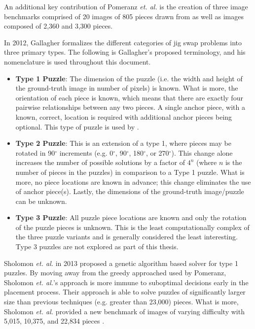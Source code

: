 \documentclass{report}
\newcommand{\numbwithdegreesymbol}[1]{#1$^\circ$}
\begin{document}
An additional key contribution of Pomeranz \textit{et. al.} is the creation of three image benchmarks comprised of 20 images of 805 pieces drawn from \cite{mcgillImageDatabase} as well as images composed of 2,360 and 3,300 pieces.

In 2012, Gallagher \cite{gallagher2012} formalizes the different categories of jig swap problems into three primary types.  The following is Gallagher's proposed terminology, and his nomenclature is used throughout this document.

\begin{itemize}

	\item \textbf{Type 1 Puzzle}: The dimension of the puzzle (i.e. the width and height of the ground-truth image in number of pixels) is known.  What is more, the orientation of each piece is known, which means that there are exactly four pairwise relationships between any two pieces.  A single anchor piece, with a known, correct, location is required with additional anchor pieces being optional.  This type of puzzle is used by \cite{cho2010, pomeranz2011}.
	
	\item \textbf{Type 2 Puzzle}: This is an extension of a type 1, where pieces may be rotated in \numbwithdegreesymbol{90} increments (e.g. \numbwithdegreesymbol{0}, \numbwithdegreesymbol{90}, \numbwithdegreesymbol{180}, or \numbwithdegreesymbol{270}).  This change alone increases the number of possible solutions by a factor of $4^n$ (where $n$ is the number of pieces in the puzzles) in comparison to a Type 1 puzzle.  What is more, no piece locations are known in advance; this change eliminates the use of anchor piece(s).  Lastly, the dimensions of the ground-truth image/puzzle can be unknown.
	
	\item \textbf{Type 3 Puzzle}: All puzzle piece locations are known and only the rotation of the puzzle pieces is unknown.  This is the least computationally complex of the three puzzle variants and is generally considered the least interesting.  Type 3 puzzles are not explored as part of this thesis.

\end{itemize}

Sholomon \textit{et. al.} \cite{sholomon2013} in 2013 proposed a genetic algorithm based solver for type 1 puzzles.  By moving away from the greedy approached used by Pomeranz, Sholomon \textit{et. al.}'s approach is more immune to suboptimal decisions early in the placement process. Their approach is able to solve puzzles of significantly larger size than previous techniques (e.g. greater than 23,000) pieces.  What is more, Sholomon \textit{et. al.} provided a new benchmark of images of varying difficulty with 5,015, 10,375, and 22,834 pieces \cite{sholomonBenchmarkImages}.
\end{document}
